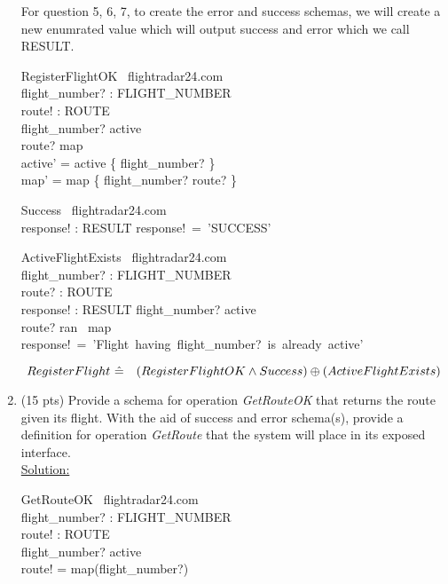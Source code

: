 \documentclass[12pt]{article}
\begin{document}
\begin{enumerate}
For question 5, 6, 7, to create the error and success schemas, we will create a new enumrated value which will output success and error which we call RESULT. 

\begin{schema}{RegisterFlightOK}
\Delta \ flightradar24.com\\
flight\_number? : FLIGHT\_NUMBER\\
route! : ROUTE\\
\where
flight\_number? \notin active\\
route? \notin \ran map\\
active' = active \cup \{ flight\_number? \}\\
map' = map \cup \{ flight\_number? \mapsto route? \}\
\end{schema}

\begin{schema}{Success}
\Xi \ flightradar24.com\\
response! : RESULT
\where
response!~=~'SUCCESS'\\
\end{schema}



\begin{schema}{ActiveFlightExists}
\Xi \ flightradar24.com\\
flight\_number? : FLIGHT\_NUMBER\\
route? : ROUTE \\
response! : RESULT
\ST
flight\_number? \in active\\
route? \in ran \ map \\
response!~=~'Flight~having~flight\_number?~is~already~active'
\end{schema}


\[ RegisterFlight~\hat{=}~\\
~~~(RegisterFlightOK \wedge Success) \oplus (ActiveFlightExists) \]




\item (15 pts) Provide a schema for operation \emph{GetRouteOK} that returns the route given its
flight. With the aid of success and error schema(s), provide a definition for operation
\emph{GetRoute} that the system will place in its exposed interface. \\
\noindent \underline{Solution:}\\

\begin{schema}{GetRouteOK}
\Xi \ flightradar24.com\\
flight\_number? : FLIGHT\_NUMBER \\
route! : ROUTE\\
\where
flight\_number? \in active\\
route! = map(flight\_number?)
\end{schema}





\end{enumerate}
\end{document}
